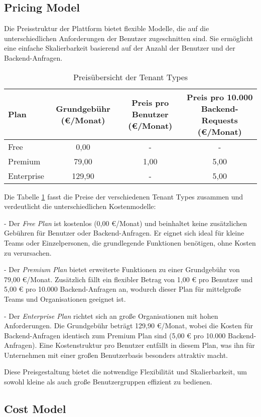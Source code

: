 \subsection{Pricing Model}
Die Preisstruktur der Plattform bietet flexible Modelle, die auf die unterschiedlichen Anforderungen der Benutzer zugeschnitten sind. 
Sie ermöglicht eine einfache Skalierbarkeit basierend auf der Anzahl der Benutzer und der Backend-Anfragen.

\begin{table}[h!]
\centering
\caption{Preisübersicht der Tenant Types}
\begin{tabular}{|l|c|c|c|}
\hline
\textbf{Plan}         & \textbf{Grundgebühr (€/Monat)} & \textbf{Preis pro Benutzer (€/Monat)} & \textbf{Preis pro 10.000 Backend-Requests (€/Monat)} \\ \hline
Free                  & 0,00                          & -                                    & -                                                   \\ \hline
Premium               & 79,00                         & 1,00                                 & 5,00                                                \\ \hline
Enterprise            & 129,90                        & -                                    & 5,00                                                \\ \hline
\end{tabular}
\label{tab:pricing}
\end{table}

Die Tabelle \ref{tab:pricing} fasst die Preise der verschiedenen Tenant Types zusammen und verdeutlicht die unterschiedlichen Kostenmodelle:

- Der \textit{Free Plan} ist kostenlos (0,00 €/Monat) und beinhaltet keine zusätzlichen Gebühren für Benutzer oder Backend-Anfragen. 
Er eignet sich ideal für kleine Teams oder Einzelpersonen, die grundlegende Funktionen benötigen, ohne Kosten zu verursachen.
  
- Der \textit{Premium Plan} bietet erweiterte Funktionen zu einer Grundgebühr von 79,00 €/Monat. 
Zusätzlich fällt ein flexibler Betrag von 1,00 € pro Benutzer und 5,00 € pro 10.000 Backend-Anfragen an, wodurch dieser Plan für mittelgroße Teams und Organisationen geeignet ist.

- Der \textit{Enterprise Plan} richtet sich an große Organisationen mit hohen Anforderungen. 
Die Grundgebühr beträgt 129,90 €/Monat, wobei die Kosten für Backend-Anfragen identisch zum Premium Plan sind (5,00 € pro 10.000 Backend-Anfragen). 
Eine Kostenstruktur pro Benutzer entfällt in diesem Plan, was ihn für Unternehmen mit einer großen Benutzerbasis besonders attraktiv macht.

Diese Preisgestaltung bietet die notwendige Flexibilität und Skalierbarkeit, um sowohl kleine als auch große Benutzergruppen effizient zu bedienen.

\subsection{Cost Model}
